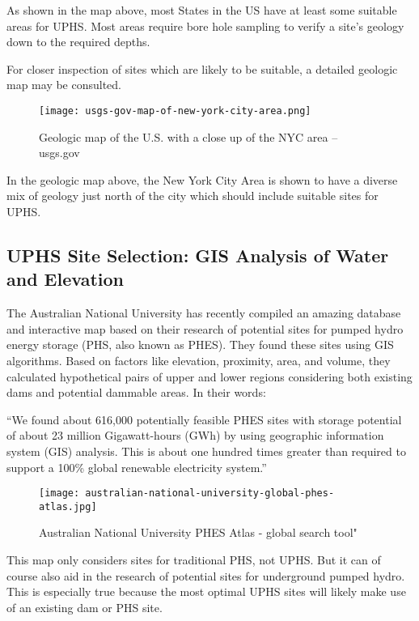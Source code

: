 \documentclass[hidelinks,12pt,a4paper]{article}
\begin{document}
As shown in the map above, most States in the US have at least some suitable areas for UPHS. Most areas require bore hole sampling to verify a site's geology down to the required depths.

For closer inspection of sites which are likely to be suitable, a detailed geologic map may be consulted.

\begin{figure}[ht!]
    \centering
    \texttt{[image: usgs-gov-map-of-new-york-city-area.png]}
    \caption{Geologic map of the U.S. with a close up of the NYC area -- usgs.gov \cite{MineralResourcesOnlineSpatialDataGeologicmaps}}
\end{figure}
\FloatBarrier

In the geologic map above, the New York City Area is shown to have a diverse mix of geology just north of the city which should include suitable sites for UPHS.

\subsection{UPHS Site Selection: GIS Analysis of Water and Elevation}
The Australian National University has recently compiled an amazing database and interactive map based on their research of potential sites for pumped hydro energy storage (PHS, also known as PHES). They found these sites using GIS algorithms. Based on factors like elevation, proximity, area, and volume, they calculated hypothetical pairs of upper and lower regions considering both existing dams and potential dammable areas. In their words:

\begin{displayquote}
“We found about 616,000 potentially feasible PHES sites with storage potential of about 23 million Gigawatt-hours (GWh) by using geographic information system (GIS) analysis. This is about one hundred times greater than required to support a 100\% global renewable electricity system.”
\end{displayquote}

\begin{figure}[ht!]
    \centering
    \texttt{[image: australian-national-university-global-phes-atlas.jpg]}
    \caption{Australian National University PHES Atlas - global search tool" \cite{AustralianNationalUniversityGlobalPHESAtlas}}
\end{figure}
\FloatBarrier

This map only considers sites for traditional PHS, not UPHS. But it can of course also aid in the research of potential sites for underground pumped hydro. This is especially true because the most optimal UPHS sites will likely make use of an existing dam or PHS site.
\end{document}
